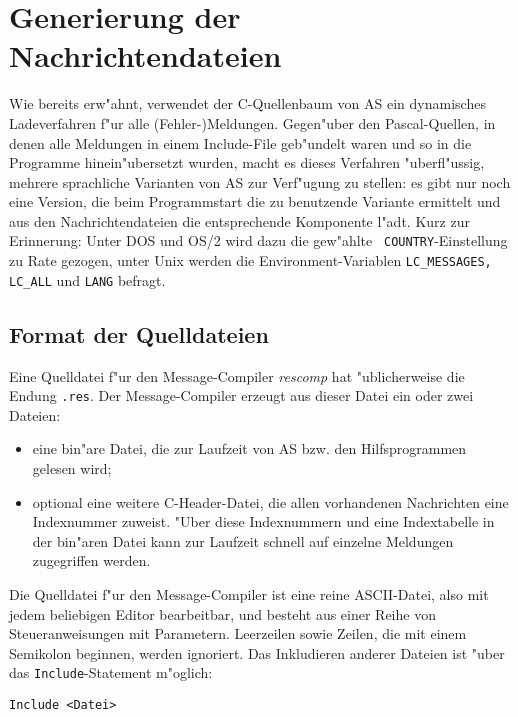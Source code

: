 \documentclass[12pt,a4paper,twoside]{report}
\begin{document}
{\section{Generierung der Nachrichtendateien}

Wie bereits erw"ahnt, verwendet der C-Quellenbaum von AS ein dynamisches
Ladeverfahren f"ur alle (Fehler-)Meldungen.  Gegen"uber den
Pascal-Quellen, in denen alle Meldungen in einem Include-File geb"undelt
waren und so in die Programme hinein"ubersetzt wurden, macht es dieses
Verfahren "uberfl"ussig, mehrere sprachliche Varianten von AS zur
Verf"ugung zu stellen: es gibt nur noch eine Version, die beim
Programmstart die zu benutzende Variante ermittelt und aus den
Nachrichtendateien die entsprechende Komponente l"adt.  Kurz zur
Erinnerung: Unter DOS und OS/2 wird dazu die gew"ahlte {\tt
COUNTRY}-Einstellung zu Rate gezogen, unter Unix werden die
Environment-Variablen {\tt LC\_MESSAGES, LC\_ALL} und {\tt LANG} befragt.

\subsection{Format der Quelldateien}

Eine Quelldatei f"ur den Message-Compiler {\em rescomp} hat "ublicherweise
die Endung {\tt .res}.  Der Message-Compiler erzeugt aus dieser Datei ein
oder zwei Dateien:
\begin{itemize}
\item{eine bin"are Datei, die zur Laufzeit von AS bzw. den Hilfsprogrammen
      gelesen wird;}
\item{optional eine weitere C-Header-Datei, die allen vorhandenen
      Nachrichten eine Indexnummer zuweist.  "Uber diese Indexnummern und
      eine Indextabelle in der bin"aren Datei kann zur Laufzeit schnell
      auf einzelne Meldungen zugegriffen werden.}
\end{itemize}

Die Quelldatei f"ur den Message-Compiler ist eine reine ASCII-Datei, also
mit jedem beliebigen Editor bearbeitbar, und besteht aus einer Reihe von
Steueranweisungen mit Parametern.  Leerzeilen sowie Zeilen, die mit einem
Semikolon beginnen, werden ignoriert.  Das Inkludieren anderer Dateien ist
"uber das {\tt Include}-Statement m"oglich:
\begin{verbatim}
Include <Datei>
\end{verbatim}

}
\end{document}
